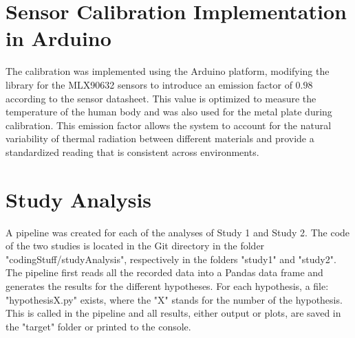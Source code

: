 \section{Sensor Calibration Implementation in Arduino}
The calibration was implemented using the Arduino platform, modifying the library for the MLX90632 sensors to introduce an emission factor of $0.98$ according to the sensor datasheet. 
This value is optimized to measure the temperature of the human body and was also used for the metal plate during calibration. 
This emission factor allows the system to account for the natural variability of thermal radiation between different materials and provide a standardized reading that is consistent across environments.

\section{Study Analysis}
A pipeline was created for each of the analyses of Study 1 and Study 2. 
The code of the two studies is located in the Git directory in the folder "codingStuff/studyAnalysis", respectively in the folders "study1" and "study2".
The pipeline first reads all the recorded data into a Pandas data frame and generates the results for the different hypotheses.
For each hypothesis, a file: "hypothesisX.py" exists, where the "X" stands for the number of the hypothesis. 
This is called in the pipeline and all results, either output or plots, are saved in the "target" folder or printed to the console.

